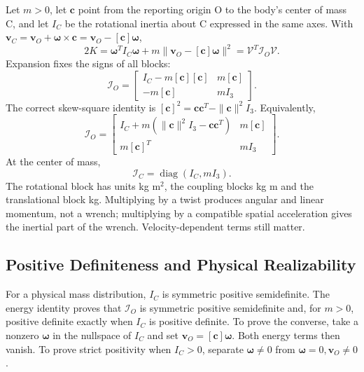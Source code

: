 Let $m>0$, let $\mathbf c$ point from the reporting origin O to the body's center of mass C, and let $I_C$ be the rotational inertia about C expressed in the same axes. With $\mathbf v_C=\mathbf v_O+\boldsymbol\omega\times\mathbf c=\mathbf v_O-[\mathbf c]\boldsymbol\omega$,
\begin{equation}
2K=\boldsymbol\omega^T I_C\boldsymbol\omega
+m\|\mathbf v_O-[\mathbf c]\boldsymbol\omega\|^2
=\mathcal V^T\mathcal I_O\mathcal V.
\label{thm:ke_spatial_quadratic}
\end{equation}
Expansion fixes the signs of all blocks:
\begin{equation}
\mathcal I_O=
\begin{bmatrix}I_C-m[\mathbf c][\mathbf c]&m[\mathbf c]\\
-m[\mathbf c]&mI_3\end{bmatrix}.
\label{eq:spatial_inertia_full}
\end{equation}
The correct skew-square identity is $[\mathbf c]^2=\mathbf c\mathbf c^T-\|\mathbf c\|^2I_3$. Equivalently,
\begin{equation}
\mathcal I_O=
\begin{bmatrix}I_C+m(\|\mathbf c\|^2I_3-\mathbf c\mathbf c^T)&m[\mathbf c]\\
m[\mathbf c]^T&mI_3\end{bmatrix}.
\label{eq:spatial_inertia_alt}
\end{equation}
At the center of mass,
\begin{equation}
\mathcal I_C=\operatorname{diag}(I_C,mI_3).
\label{eq:spatial_inertia_cocom}
\end{equation}
The rotational block has units kg m$^2$, the coupling blocks kg m and the translational block kg. Multiplying by a twist produces angular and linear momentum, not a wrench; multiplying by a compatible spatial acceleration gives the inertial part of the wrench. Velocity-dependent terms still matter.

\subsection{Positive Definiteness and Physical Realizability}
\label{thm:spatial_inertia_spd}

For a physical mass distribution, $I_C$ is symmetric positive semidefinite. The energy identity proves that $\mathcal I_O$ is symmetric positive semidefinite and, for $m>0$, positive definite exactly when $I_C$ is positive definite. To prove the converse, take a nonzero $\boldsymbol\omega$ in the nullspace of $I_C$ and set $\mathbf v_O=[\mathbf c]\boldsymbol\omega$. Both energy terms then vanish. To prove strict positivity when $I_C>0$, separate $\boldsymbol\omega\ne0$ from $\boldsymbol\omega=0,\mathbf v_O\ne0$.

